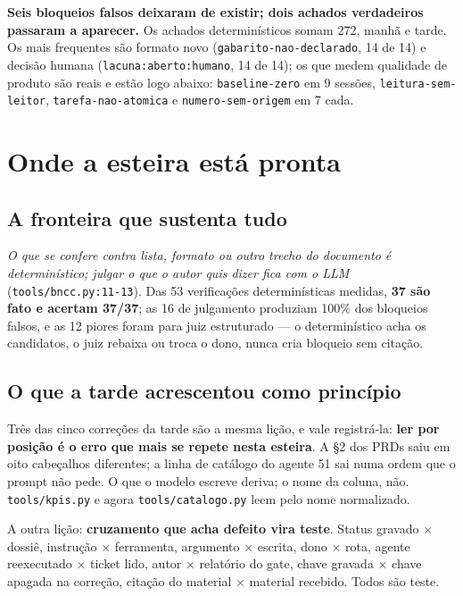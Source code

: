 \documentclass[11pt,a4paper]{article}
\begin{document}
\textbf{Seis bloqueios falsos deixaram de existir; dois achados verdadeiros passaram a aparecer.} Os achados determinísticos somam 272, manhã e tarde. Os mais frequentes são formato novo (\texttt{gabarito-nao-declarado}, 14 de 14) e decisão humana (\texttt{lacuna:aberto:humano}, 14 de 14); os que medem qualidade de produto são reais e estão logo abaixo: \texttt{baseline-zero} em 9 sessões, \texttt{leitura-sem-leitor}, \texttt{tarefa-nao-atomica} e \texttt{numero-sem-origem} em 7 cada.

\section{Onde a esteira está pronta}

\subsection{A fronteira que sustenta tudo}

\emph{O que se confere contra lista, formato ou outro trecho do documento é determinístico; julgar o que o autor quis dizer fica com o LLM} (\texttt{tools/bncc.py:11-13}). Das 53 verificações determinísticas medidas, \textbf{37 são fato e acertam 37/37}; as 16 de julgamento produziam 100\% dos bloqueios falsos, e as 12 piores foram para juiz estruturado --- o determinístico acha os candidatos, o juiz rebaixa ou troca o dono, nunca cria bloqueio sem citação.

\subsection{O que a tarde acrescentou como princípio}

Três das cinco correções da tarde são a mesma lição, e vale registrá-la: \textbf{ler por posição é o erro que mais se repete nesta esteira}. A \S{}2 dos PRDs saiu em oito cabeçalhos diferentes; a linha de catálogo do agente 51 sai numa ordem que o prompt não pede. O que o modelo escreve deriva; o nome da coluna, não. \texttt{tools/kpis.py} e agora \texttt{tools/catalogo.py} leem pelo nome normalizado.

A outra lição: \textbf{cruzamento que acha defeito vira teste}. Status gravado $\times$ dossiê, instrução $\times$ ferramenta, argumento $\times$ escrita, dono $\times$ rota, agente reexecutado $\times$ ticket lido, autor $\times$ relatório do gate, chave gravada $\times$ chave apagada na correção, citação do material $\times$ material recebido. Todos são teste.
\end{document}
